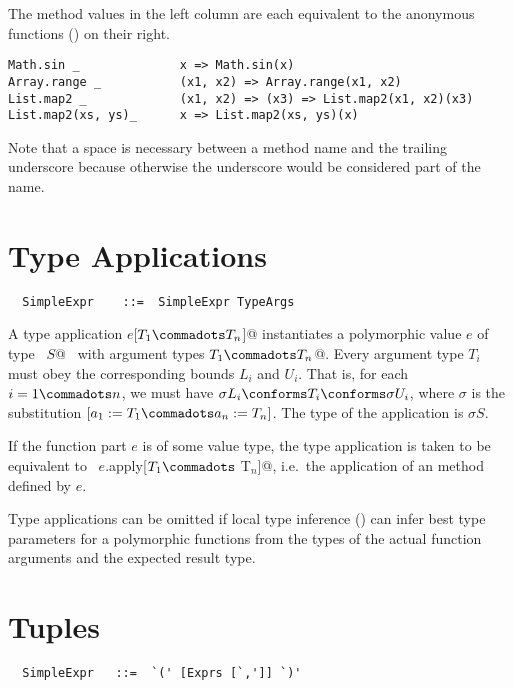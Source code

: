 \example The method values in the left column are each equivalent to the 
anonymous functions () on their right.

\begin{lstlisting}
Math.sin _              x => Math.sin(x)
Array.range _           (x1, x2) => Array.range(x1, x2)
List.map2 _             (x1, x2) => (x3) => List.map2(x1, x2)(x3)
List.map2(xs, ys)_      x => List.map2(xs, ys)(x)
\end{lstlisting}

Note that a space is necessary between a method name and the trailing underscore
because otherwise the underscore would be considered part of the name.  

\section{Type Applications}
\label{sec:type-app}
\syntax\begin{lstlisting}
  SimpleExpr    ::=  SimpleExpr TypeArgs
\end{lstlisting}

A type application \lstinline@$e$[$T_1 \commadots T_n$]@ instantiates a
polymorphic value $e$ of type
~\lstinline@[$a_1$ >: $L_1$ <: $U_1 \commadots a_n$ >: $L_n$ <: $U_n$]$S$@~ with
argument types \lstinline@$T_1 \commadots T_n$@.  Every argument type
$T_i$ must obey the corresponding bounds $L_i$ and
$U_i$.  That is, for each $i = 1 \commadots n$, we must
have $\sigma L_i  \conforms T_i \conforms \sigma U_i$, where $\sigma$ is the
substitution $[a_1 := T_1 \commadots a_n := T_n]$.  The type
of the application is $\sigma S$.  

If the function part $e$ is of some value type, the type application
is taken to be equivalent to 
~\lstinline@$e$.apply[$T_1 \commadots$ T$_n$]@, i.e.\ the application of an  method defined by
$e$.

Type applications can be omitted if local type inference
() can infer best type parameters for a
polymorphic functions from the types of the actual function arguments
and the expected result type.

\section{Tuples}
\label{sec:tuples}

\syntax\begin{lstlisting}
  SimpleExpr   ::=  `(' [Exprs [`,']] `)'
\end{lstlisting}

